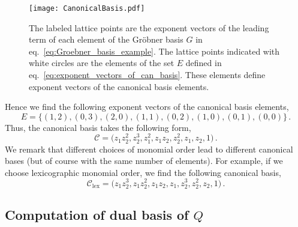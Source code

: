 \documentclass[dvipsnames,preprint,12pt,sort&compress]{elsarticle}
\begin{document}
\begin{figure}[!h]
\begin{center}
\texttt{[image: CanonicalBasis.pdf]}
\caption{The labeled lattice points are the exponent vectors
of the leading term of each element of the Gr{\"o}bner basis $G$
in eq.~\eqref{eq:Groebner_basis_example}. The lattice points
indicated with white circles are the elements of the set
$E$ defined in eq.~\eqref{eq:exponent_vectors_of_can_basis}.
These elements define exponent vectors of the canonical basis elements.}
\label{fig:canonical_basis}
\end{center}
\end{figure}


Hence we find the following exponent vectors of the canonical
basis elements,
\begin{equation}
E = \big\{ (1,2), (0,3), (2,0), (1,1), (0,2), (1,0), (0,1), (0,0) \big\} \,.
\end{equation}
Thus, the canonical basis takes the following form,
\begin{equation}
\mathcal{C} = \big( z_1 z_2^2, z_2^3, z_1^2, z_1 z_2, z_2^2, z_1, z_2, 1 \big) \,.
\label{eq:canonical_basis_example}
\end{equation}
We remark that different choices of monomial order lead to
different canonical bases (but of course with the same number of elements).
For example, if we choose lexicographic monomial
order, we find the following canonical basis,
\begin{equation}
\mathcal{C}_\mathrm{lex} = \big( z_1 z_2^3, z_1 z_2^2, z_1 z_2, z_1, z_2^3, z_2^2, z_2, 1 \big) \,.
\end{equation}


\subsection{Computation of dual basis of $Q$}
\end{document}
